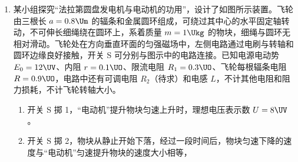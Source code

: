 \documentclass[\gkver]{gaokaozhenti}
\begin{document}
\begin{enumerate}
{（2）平板加速至与滑块共速过程，根据动量守恒 $mv_{B} = (M + m)v_{\text{共}}$
根据能量守恒
$\Delta E = \frac{1}{2}mv_{B}^{2} - \frac{1}{2}(M + m)v_{\text{共}}^{2}$
解得 $\Delta E = 0.625\UJ$

（3）若 $\mu_{2} = 0.1$，平板与滑块相互作用过程中，加速度分别为
$a_{1} = \mu_{1}g = 6\Umsq$，$a_{2} = \frac{\mu_{1}mg - \mu_{2}(M + m)g}{M} = 4\Umsq$
共速后，共同加速度大小为 $a_{3} = \mu_{2}g = 1\Umsq$
考虑滑块可能一直减速直到 H，也可能先与木板共速然后共同减速；
假设先与木板共速然后共同减速，则共速过程
$v = v_{E} - a_{1}t_{1} = a_{2}t_{1}$
共速过程，滑块、木板位移分别为
$x_{1} = \frac{v + v_{E}}{2}t_{1}$，$x_{2} = \frac{v}{2}t_{1}$
共速时，相对位移应为 $\Delta x = L = x_{1} - x_{2}$
解得 $v_{E} = 6\Ums$，$v = 2.4\Ums$
随后共同减速 $x_{3} = d - x_{1} = 1.88\Um$
到达 H 速度 $v_{H} = \sqrt{v^{2} - 2a_{3}x_{3}} = \sqrt{2}\Ums$
说明可以到达 H，因此假设成立，若滑块初速度再增大，则会从木板右侧掉落。
}

\item
某小组探究“法拉第圆盘发电机与电动机的功用”，设计了如图所示装置。飞轮由三根长 $a = 0.8\Um$ 的辐条和金属圆环组成，可绕过其中心的水平固定轴转动，不可伸长细绳绕在圆环上，系着质量 $m = 1\Ukg$ 的物块，细绳与圆环无相对滑动。飞轮处在方向垂直环面的匀强磁场中，左侧电路通过电刷与转轴和圆环边缘良好接触，开关 S 可分别与图示中的电路连接。已知电源电动势 $E_{0} = 12\UV$、内阻 $r = 0.1\UO$、限流电阻 $R_{1} = 0.3\UO$、飞轮每根辐条电阻 $R = 0.9\UO$，电路中还有可调电阻 $R_{2}$（待求）和电感 $L$，不计其他电阻和阻力损耗，不计飞轮转轴大小。

\begin{enumerate}
	\item
	开关 S 掷 1，“电动机”提升物块匀速上升时，理想电压表示数 $U = 8\UV$。
	\item
	开关 S 掷 2，物块从静止开始下落，经过一段时间后，物块匀速下降的速度与“电动机”匀速提升物块的速度大小相等，
\end{enumerate}
\end{enumerate}
\end{document}

